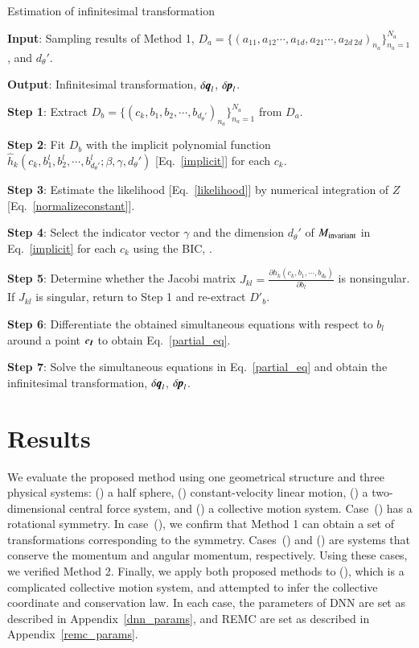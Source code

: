 \documentclass[preprint,
bibnotes,
 amsmath,amssymb,
 aps,
]{revtex4-1}
\newcounter{num}
\newcommand{\rnum}[1]{\setcounter{num}{#1}\roman{num}}
\begin{document}
\begin{algorithm}[H]                  
\caption{Estimation of infinitesimal transformation}         
\label{alg2}                          
\begin{algorithmic}
\item[{\bf Input}:] Sampling results of Method 1, $D_{a} = \{(a_{11},a_{12}\cdots ,a_{1d},a_{21} \cdots ,a_{2d\:2d})_{n_a}\}_{n_{a}=1}^{N_a}$, and $d_{\theta}'$.
\item[{\bf Output}:] Infinitesimal transformation, $\delta {\textit{\textbf{q}}}_l$, $\delta {\textit{\textbf{p}}}_l$. 
\item[{\bf Step 1}:] Extract $D_b = \{(c_{k},b_1,b_2,\cdots,b_{d_{\theta}'})_{n_a}\}_{n_a=1}^{N_a}$ from $D_a$. 
\item[{\bf Step 2}:] Fit $D_b$ with the implicit polynomial function $\hat{h}_k(c_k, b_1^l,b_2^l,\cdots,b_{d_{\theta}'}^l;\beta,\gamma,d_{\theta}')$ [Eq.~\eqref{implicit}] for each $c_k$. 
\item[{\bf Step 3}:] Estimate the likelihood [Eq.~\eqref{likelihood}] by numerical integration of $Z$ [Eq.~\eqref{normalizeconstant}]. 
\item[{\bf Step 4}:] Select the indicator vector $\gamma$ and the dimension $d_{\theta}'$ of $M_{\rm invariant}$ in Eq.~\eqref{implicit} for each $c_k$ using the BIC, . 
\item[{\bf Step 5}:] Determine whether the Jacobi matrix $J_{kl} = \frac{\partial h_k(c_{k},b_1,\cdots,b_{d_{\theta}})}{\partial b_l}$ is nonsingular. If $J_{kl}$ is singular, return to Step 1 and re-extract $D'_b$. 
\item[{\bf Step 6}:] Differentiate the obtained simultaneous equations with respect to $b_l$ around a point $e_{\textit{\textbf{I}}}$ to obtain Eq.~\eqref{partial_eq}. 
\item[{\bf Step 7}:] Solve the simultaneous equations in Eq.~\eqref{partial_eq} and obtain the infinitesimal transformation, $\delta {\textit{\textbf{q}}}_l$, $\delta {\textit{\textbf{p}}}_l$.
\end{algorithmic}
\end{algorithm}

\section{Results}
\label{results}
We evaluate the proposed method using one geometrical structure and three physical systems: 
(\rnum{1}) a half sphere, (\rnum{2}) constant-velocity linear motion, (\rnum{3}) a two-dimensional central force system, and (\rnum{4}) a collective motion system. 
Case~(\rnum{1}) has a rotational symmetry. In case~(\rnum{1}), we confirm that Method 1 can obtain a set of transformations corresponding to the symmetry.
Cases~(\rnum{2}) and (\rnum{3}) are systems that conserve the momentum and angular momentum, respectively. Using these cases, we verified Method 2. 
Finally, we apply both proposed methods to (\rnum{4}), which is a complicated collective motion system, and attempted to infer the collective coordinate and conservation law. In each case, the parameters of DNN are set as described in Appendix~\ref{dnn_params}, and REMC are set as described in Appendix~\ref{remc_params}.  
\end{document}
